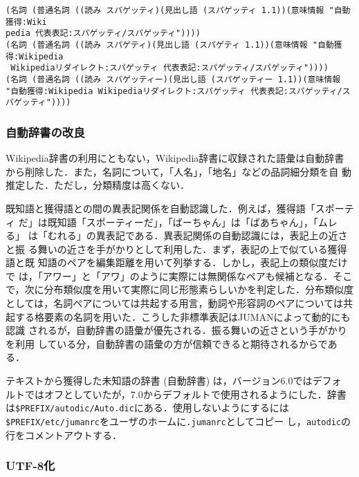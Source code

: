 \documentclass[a4j,titlepage]{jarticle}
\begin{document}
\begin{verbatim}
(名詞 (普通名詞 ((読み スパゲッティ)(見出し語 (スパゲッティ 1.1))(意味情報 "自動獲得:Wiki
pedia 代表表記:スパゲッティ/スパゲッティ"))))
(名詞 (普通名詞 ((読み スパゲティ)(見出し語 (スパゲティ 1.1))(意味情報 "自動獲得:Wikipedia
 Wikipediaリダイレクト:スパゲッティ 代表表記:スパゲッティ/スパゲッティ"))))
(名詞 (普通名詞 ((読み スパゲッティー)(見出し語 (スパゲッティー 1.1))(意味情報 "自動獲得:Wikipedia Wikipediaリダイレクト:スパゲッティ 代表表記:スパゲッティ/スパゲッティ"))))
\end{verbatim}


\subsubsection{自動辞書の改良}

Wikipedia辞書の利用にともない，Wikipedia辞書に収録された語彙は自動辞書
から削除した．また，名詞について，「人名」，「地名」などの品詞細分類を自
動推定した．ただし，分類精度は高くない．

既知語と獲得語との間の異表記関係を自動認識した．例えば，獲得語「スポーティ
だ」は既知語「スポーティーだ」，「ばーちゃん」は「ばあちゃん」，「ムレる」
は「むれる」の異表記である．異表記関係の自動認識には，表記上の近さと振
る舞いの近さを手がかりとして利用した．まず，表記の上で似ている獲得語と既
知語のペアを編集距離を用いて列挙する．しかし，表記上の類似度だけで
は，「アワー」と「アワ」のように実際には無関係なペアも候補となる．そこ
で，次に分布類似度を用いて実際に同じ形態素らしいかを判定した．分布類似度
としては，名詞ペアについては共起する用言，動詞や形容詞のペアについては共
起する格要素の名詞を用いた．こうした非標準表記はJUMANによって動的にも認識
されるが，自動辞書の語彙が優先される．振る舞いの近さという手がかりを利用
している分，自動辞書の語彙の方が信頼できると期待されるからである．

テキストから獲得した未知語の辞書 (自動辞書) は，バージョン6.0ではデフォ
ルトではオフとしていたが，7.0からデフォルトで使用されるようにした．辞書
は\texttt{\$PREFIX/autodic/Auto.dic}にある．使用しないようにするには
\texttt{\$PREFIX/etc/jumanrc}をユーザのホームに{\tt .jumanrc}としてコピー
し，\texttt{autodic}の行をコメントアウトする．


\subsubsection{UTF-8化}
\end{document}
